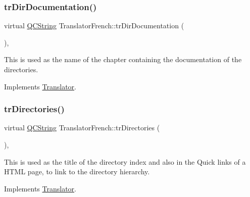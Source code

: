\mbox{\label{class_translator_french_a83c744b4504de71369806b18c221a040}} 
\subsubsection{\texorpdfstring{trDirDocumentation()}{trDirDocumentation()}}
{\footnotesize\ttfamily virtual \mbox{\hyperlink{class_q_c_string}{Q\+C\+String}} Translator\+French\+::tr\+Dir\+Documentation (\begin{DoxyParamCaption}{ }\end{DoxyParamCaption})\hspace{0.3cm}{\ttfamily [inline]}, {\ttfamily [virtual]}}

This is used as the name of the chapter containing the documentation of the directories. 

Implements \mbox{\hyperlink{class_translator}{Translator}}.

\mbox{\label{class_translator_french_a686d09444c1c33d99896f43feef5200e}} 
\subsubsection{\texorpdfstring{trDirectories()}{trDirectories()}}
{\footnotesize\ttfamily virtual \mbox{\hyperlink{class_q_c_string}{Q\+C\+String}} Translator\+French\+::tr\+Directories (\begin{DoxyParamCaption}{ }\end{DoxyParamCaption})\hspace{0.3cm}{\ttfamily [inline]}, {\ttfamily [virtual]}}

This is used as the title of the directory index and also in the Quick links of a H\+T\+ML page, to link to the directory hierarchy. 

Implements \mbox{\hyperlink{class_translator}{Translator}}.

\mbox{\label{class_translator_french_a5c3dab46702230b2d7ab78856b713a82}} 

